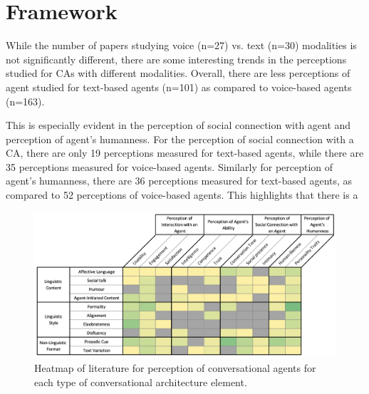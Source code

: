 \documentclass[sigconf,screen,review, anonymous]{acmart}
\begin{document}
\section{Framework}

While the number of papers studying voice (n=27) vs. text (n=30) modalities is not significantly different, there are some interesting trends in the perceptions studied for CAs with different modalities. Overall, there are less perceptions of agent studied for text-based agents (n=101) as compared to voice-based agents (n=163).
 
This is especially evident in the perception of social connection with agent and perception of agent's humanness. For the perception of social connection with a CA, there are only 19 perceptions measured for text-based agents, while there are 35 perceptions measured for voice-based agents. Similarly for perception of agent's humanness, there are 36 perceptions measured for text-based agents, as compared to 52 perceptions of voice-based agents. This highlights that there is a 

\begin{figure}[]
  \centering
  \includegraphics[width=\textwidth]{fig-heatmap-impact.png}
  \caption{Heatmap of literature for perception of conversational agents for each type of conversational architecture element.}
  \label{fig:heatmap-impact}
\end{figure}
\end{document}
